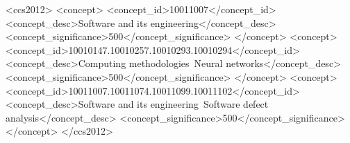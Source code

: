 

\begin{CCSXML}
<ccs2012>
   <concept>
       <concept_id>10011007</concept_id>
       <concept_desc>Software and its engineering</concept_desc>
       <concept_significance>500</concept_significance>
       </concept>
   <concept>
       <concept_id>10010147.10010257.10010293.10010294</concept_id>
       <concept_desc>Computing methodologies~Neural networks</concept_desc>
       <concept_significance>500</concept_significance>
       </concept>
   <concept>
       <concept_id>10011007.10011074.10011099.10011102</concept_id>
       <concept_desc>Software and its engineering~Software defect analysis</concept_desc>
       <concept_significance>500</concept_significance>
       </concept>
 </ccs2012>
\end{CCSXML}


\renewcommand\footnotetextcopyrightpermission[1]{} %